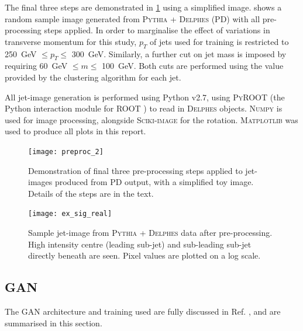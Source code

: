 \documentclass[twocolumn,twoside]{article}
\newcommand{\pkg}[1]{\textsc{#1}}
\begin{document}
The final three steps are demonstrated in \cref{fig:preproc} using a simplified image.  shows a random sample image generated from \pkg{Pythia} + \pkg{Delphes} (PD) with all pre-processing steps applied. In order to marginalise the effect of variations in transverse momentum for this study, $p_T$ of jets used for training is restricted to \SI{250}{\giga\electronvolt} $\leq p_T \leq$ \SI{300}{\giga\electronvolt}. Similarly, a further cut on jet mass is imposed by requiring \SI{60}{\giga\electronvolt} $\leq m \leq$ \SI{100}{\giga\electronvolt}. Both cuts are performed using the value provided by the clustering algorithm for each jet.

All jet-image generation is performed using Python v2.7, using \pkg{PyROOT} (the Python interaction module for \pkg{ROOT} \cite{root}) to read in \pkg{Delphes} objects. \pkg{Numpy} \cite{numpy} is used for image processing, alongside \pkg{Sciki-image} \cite{skimage} for the rotation. \pkg{Matplotlib} \cite{matplotlib} was used to produce all plots in this report.

\begin{figure}[H]
	\centering
	\texttt{[image: preproc\_2]}
%	
	
	\caption{Demonstration of final three pre-processing steps applied to jet-images produced from PD output, with a simplified toy image. Details of the steps are in the text.}
	\label{fig:preproc}
	
\end{figure}

\begin{figure}[H]
	\centering
	\texttt{[image: ex\_sig\_real]}
	
	\caption{Sample jet-image from \pkg{Pythia} + \pkg{Delphes} data after pre-processing. High intensity centre (leading sub-jet) and sub-leading sub-jet directly beneath are seen. Pixel values are plotted on a log scale.}
	\label{fig:ex_sig_real}
	
\end{figure}

\subsection{GAN}
The GAN architecture and training used are fully discussed in Ref. \cite{de2017learning}, and are summarised in this section.
 
\end{document}
